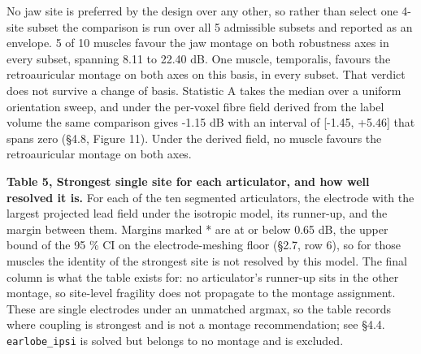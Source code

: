 \documentclass[
  11pt,
  letterpaper,
]{article}
\begin{document}
No jaw site is preferred by the design over any other, so rather than select one
4-site subset the comparison is run over all 5 admissible subsets and reported as
an envelope. 5 of 10 muscles favour the jaw montage on both robustness axes in
every subset, spanning 8.11 to 22.40 dB. One muscle, temporalis, favours the
retroauricular montage on both axes on this basis, in every subset. That verdict
does not survive a change of basis. Statistic A takes the median over a uniform
orientation sweep, and under the per-voxel fibre field derived from the label
volume the same comparison gives -1.15 dB with an interval of {[}-1.45, +5.46{]}
that spans zero (§4.8, Figure 11). Under the derived field, no muscle favours the
retroauricular montage on both axes.

\textbf{Table 5, Strongest single site for each articulator, and how well resolved it
is.} For each of the ten segmented articulators, the electrode with the largest
projected lead field under the isotropic model, its runner-up, and the margin
between them. Margins marked * are at or below 0.65 dB, the upper bound of the
95 \% CI on the electrode-meshing floor (§2.7, row 6), so for those muscles the
identity of the strongest site is not resolved by this model. The final column
is what the table exists for: no articulator's runner-up sits in the other
montage, so site-level fragility does not propagate to the montage assignment.
These are single electrodes under an unmatched argmax, so the table records
where coupling is strongest and is not a montage recommendation; see §4.4.
\texttt{earlobe\_ipsi} is solved but belongs to no montage and is excluded.
\end{document}
